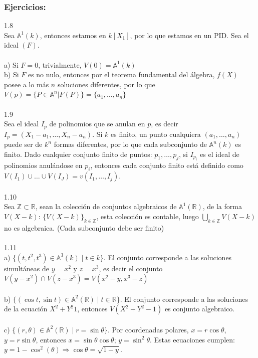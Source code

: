 \documentclass{article}
\newcommand{\R}{\mathbb{R}}
\newcommand{\A}{\mathbb{A}}
\newcommand{\Z}{\mathbb{Z}}
\begin{document}
\subsubsection*{Ejercicios:}
1.8
\\
Sea $\mathbb{A}^{1}(k)$, entonces estamos en $k[X_1]$, por lo que estamos en un PID. Sea el ideal $(F)$.
\\
\\
a) Si $F=0$, trivialmente, $V(0)=\mathbb{A}^{1}(k)$
\\
b) Si $F$ es no nulo, entonces por el teorema fundamental del álgebra, $f(X)$ posee a lo más $n$ soluciones diferentes, por lo que $V(p)=\{P \in \mathbb{A}^{n} | F(P) \}=\{ a_1,\dots,a_n\}$
\\
\\
1.9
\\
Sea el ideal $I_p$ de polinomios que se anulan en $p$, es decir $I_p=(X_1-a_1, \dots , X_n - a_n)$. Si $k$ es finito, un punto cualquiera $(a_1,\dots,a_n)$ puede ser de $k^n$ formas diferentes, por lo que cada subconjunto de $\mathbb{A}^{n}(k)$ es finito. Dado cualquier conjunto finito de puntos: $p_1,\dots,p_j$, si $I_{p_{i}}$ es el ideal de polinomios anulándose en $p_i$, entonces cada conjunto finito está definido como $V(I_1)\cup \dots \cup V(I_J)=v(I_1,\dots,I_j)$.
\\
\\
1.10
\\
Sea $\mathbb{Z} \subset \mathbb{R}$, sean la colección de conjuntos algebraicos de $\mathbb{A}^{1}(\mathbb{R})$, de la forma $V(X-k)$: $\{V(X-k) \}_{k \in \Z}$, esta  colección es contable, luego $\bigcup_{k \in \Z} V(X-k)$ no es algebraica. (Cada subconjunto debe ser finito)
\\
\\
1.11
\\
a) $\{ (t,t^{2},t^{3}) \in \A^{3}(k) \mid t \in k\}$. El conjunto corresponde a las soluciones simultáneas de $y=x^{2}$ y $z=x^3$, es decir el conjunto $V(y-x^{2}) \cap V(z-x^{3})=V(x^{2}-y,x^{3}-z)$
\\
\\
b) $\{ (\cos{t},\sin{t}) \in \A^{2}(\R) \mid t \in \R \}$. El conjunto corresponde a las soluciones de la ecuación $X^2 + Y^2 1$, entonces $V(X^2 +Y^2 -1)$ es conjunto algebraico.
\\
\\
c) $\{(r,\theta) \in \A^{2}(\R) \mid r=\sin{\theta} \}$. Por coordenadas polares, $x=r\cos{\theta}$, $y=r\sin{\theta}$, entonces $x=\sin{\theta} \cos{\theta}$; $y= \sin^{2}{\theta}$. Estas ecuaciones cumplen: $y=1-\cos^{2}(\theta) \Longrightarrow \cos{\theta}=\sqrt{1-y}$.
\end{document}
